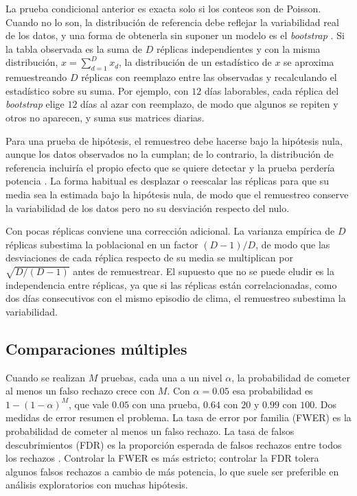 La prueba condicional anterior es exacta solo si los conteos son de Poisson.
Cuando no lo son, la distribución de referencia debe reflejar la variabilidad
real de los datos, y una forma de obtenerla sin suponer un modelo es el
\emph{bootstrap} \cite{Efron1993}. Si la tabla observada es la suma de $D$
réplicas independientes y con la misma distribución, $x = \sum_{d=1}^{D} x_d$,
la distribución de un estadístico de $x$ se aproxima remuestreando $D$ réplicas
con reemplazo entre las observadas y recalculando el estadístico sobre su suma.
Por ejemplo, con $12$ días laborables, cada réplica del \emph{bootstrap} elige $12$
días al azar con reemplazo, de modo que algunos se repiten y otros no aparecen, y
suma sus matrices diarias.

Para una prueba de hipótesis, el remuestreo debe hacerse bajo la hipótesis
nula, aunque los datos observados no la cumplan; de lo contrario, la
distribución de referencia incluiría el propio efecto que se quiere detectar y
la prueba perdería potencia \cite{HallWilson1991}. La forma habitual es
desplazar o reescalar las réplicas para que su media sea la estimada bajo la
hipótesis nula, de modo que el remuestreo conserve la variabilidad de los datos
pero no su desviación respecto del nulo.

Con pocas réplicas conviene una corrección adicional. La varianza empírica de
$D$ réplicas subestima la poblacional en un factor $(D-1)/D$, de modo que las
desviaciones de cada réplica respecto de su media se multiplican por
$\sqrt{D/(D-1)}$ antes de remuestrear. El supuesto que no se puede eludir es la
independencia entre réplicas, ya que si las réplicas están correlacionadas, como dos
días consecutivos con el mismo episodio de clima, el remuestreo subestima la
variabilidad.

\subsection{Comparaciones múltiples}\label{sec:est-multiplicidad}

Cuando se realizan $M$ pruebas, cada una a un nivel $\alpha$, la probabilidad de
cometer al menos un falso rechazo crece con $M$. Con $\alpha = 0.05$ esa probabilidad es $1-(1-\alpha)^M$, que vale $0.05$ con una prueba, $0.64$ con $20$ y $0.99$ con $100$. Dos medidas de error resumen el
problema. La tasa de error por familia (FWER) es la probabilidad de cometer al
menos un falso rechazo. La tasa de falsos descubrimientos (FDR) es la proporción
esperada de falsos rechazos entre todos los rechazos \cite{Benjamini1995}.
Controlar la FWER es más estricto; controlar la FDR tolera algunos falsos
rechazos a cambio de más potencia, lo que suele ser preferible en análisis
exploratorios con muchas hipótesis.

